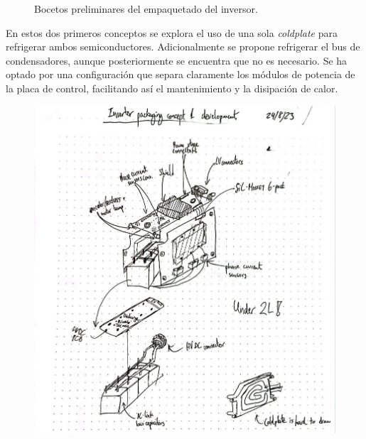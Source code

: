 \begin{figure}[H]
\begin{minipage}{0.45\textwidth}
	\end{minipage}
	\caption{Bocetos preliminares del empaquetado del inversor.}
\end{figure}

En estos dos primeros conceptos se explora el uso de una sola \textit{coldplate} para refrigerar ambos semiconductores. Adicionalmente se propone refrigerar el bus de condensadores, aunque posteriormente se encuentra que no es necesario. Se ha optado por una configuración que separa claramente los módulos de potencia de la placa de control, facilitando así el mantenimiento y la disipación de calor.

\begin{figure}[H]
	\centering
	\begin{minipage}{0.45\textwidth}
		\centering
		\includegraphics[width=\textwidth]{fig/boceto3}
	\end{minipage}\hfill
	\begin{minipage}{0.45\textwidth}
		\centering

\end{minipage}
\end{figure}
